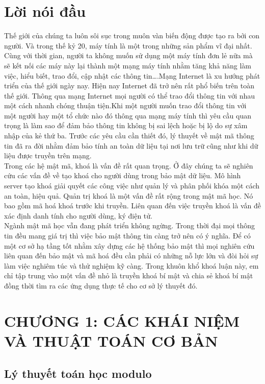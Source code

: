 \documentclass[12pt,a4paper]{report}
\begin{document}
\chapter*{Lời nói đầu}
Thế giới của chúng ta luôn sôi sục trong muôn vàn biến động được tạo ra bởi con người. Và trong thế kỷ 20, máy tính là một trong những sản phẩm vĩ đại nhất. Cùng với thời gian, người ta không muốn sử dụng một máy tính đơn lẻ nữa mà sẽ kết nối các máy này lại thành một mạng máy tính nhằm tăng khả năng làm việc, hiểu biết, trao đổi, cập nhật các thông tin….Mạng Internet là xu hướng phát triển của thế giới ngày nay. Hiện nay Internet đã trở nên rất phổ biến trên toàn thế giới. Thông qua mạng Internet  mọi người có thể trao đổi thông tin với nhau một cách nhanh chóng thuận tiện.Khi một người muốn trao đổi thông tin với một người hay một tổ chức nào đó thông qua mạng máy tính thì yêu cầu quan trọng là làm sao để đảm bảo thông tin không bị sai lệch hoặc bị lộ do sự xâm nhập của kẻ thứ ba. Trước các yêu cầu cần thiết đó, lý thuyết về mật mã thông tin đã ra đời nhằm đảm bảo tính an toàn dữ liệu tại nơi lưu trữ cũng như khi dữ liệu được truyền trên mạng. \\
Trong các hệ mật mã, khoá là vấn đề rất quan trọng. Ở đây chúng ta sẽ nghiên cứu các vấn đề về tạo khoá cho người dùng trong bảo mật dữ liệu. Mô hình server tạo khoá giải quyết các công việc như quản lý và phân phối khóa một cách an toàn, hiệu quả. Quản trị khoá là một vấn đề rất rộng trong mật mã học. Nó bao gồm mã hoá khoá trước khi truyền. Liên quan đến việc truyền khoá là vấn đề xác định danh tính cho người dùng, ký điện tử.\\
Ngành mật mã học vẫn đang phát triển không ngừng. Trong thời đại mọi thông tin đều mang giá trị thì việc bảo mật thông tin càng trở nên có ý nghĩa. Để có một cơ sở hạ tầng tốt nhằm xây dựng các hệ thống bảo mật thì mọi nghiên cứu liên quan đến bảo mật và mã hoá đều cần phải có những nỗ lực lớn và đòi hỏi sự làm việc nghiêm túc và thử nghiệm kỹ càng. Trong khuôn khổ khoá luận này, em chỉ tập trung vào một vấn đề nhỏ là truyền khoá bí mật và chia sẻ khoá bí mật đồng thời tìm ra các ứng dụng thực tế cho cơ sở lý thuyết đó.
\tableofcontents
\dominitoc
\chapter{CHƯƠNG 1: CÁC KHÁI NIỆM VÀ THUẬT TOÁN CƠ BẢN}
\minitoc
{} 
\section{Lý thuyết toán học modulo }
\end{document}
